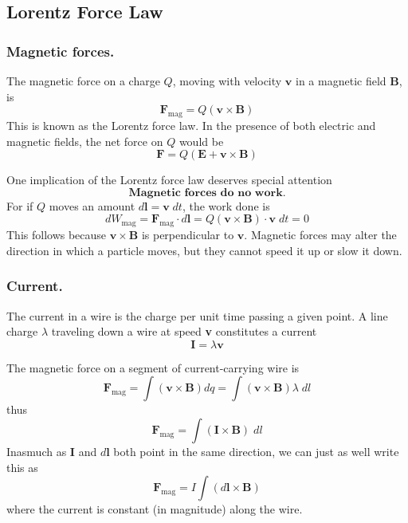 \documentclass[../../../main.tex]{subfiles}
\begin{document}
\subsection{Lorentz Force Law}
\subsubsection{Magnetic forces.} The magnetic force on a charge $Q$, moving with velocity $\mathbf{v}$ in a magnetic field \textbf{B}, is
\begin{equation*}
    \mathbf{F}_{\text{mag}} = Q(\mathbf{v} \times \mathbf{B})
\end{equation*}
This is known as the Lorentz force law. In the presence of both electric and magnetic fields, the net force on $Q$ would be
\begin{equation*}
    \mathbf{F}= Q(\mathbf{E}+\mathbf{v} \times \mathbf{B})
\end{equation*}

One implication of the Lorentz force law deserves special attention
\begin{equation*}
    \boxed{
        \textbf{Magnetic forces do no work.}
    }
\end{equation*}
For if $Q$ moves an amount $d\mathbf{l} = \mathbf{v} \;dt$, the work done is
\begin{equation*}
    dW_{\text{mag}} = \mathbf{F}_{\text{mag}} \cdot d\mathbf{l} = Q(\mathbf{v} \times \mathbf{B}) \cdot \mathbf{v} \;dt = 0
\end{equation*}
This follows because $\mathbf{v} \times \mathbf{B}$ is perpendicular to $\mathbf{v}$. Magnetic forces may alter the direction in which a particle moves, but they cannot speed it up or slow it down.

\subsubsection{Current.} The current in a wire is the charge per unit time passing a given point. A line charge $\lambda$ traveling down a wire at speed \textbf{v} constitutes a current
\begin{equation*}
    \mathbf{I}=\lambda\mathbf{v}
\end{equation*}

The magnetic force on a segment of current-carrying wire is
\begin{equation*}
    \mathbf{F}_{\text{mag}}=\int (\mathbf{v} \times \mathbf{B}) dq=\int (\mathbf{v} \times \mathbf{B}) \lambda\; dl
\end{equation*}
thus
\begin{equation*}
    \mathbf{F}_{\text{mag}}=\int (\mathbf{I}\times \mathbf{B})\;dl
\end{equation*}
Inasmuch as $\mathbf{I}$ and $d\mathbf{l}$ both point in the same direction, we can just as well write
this as
\begin{equation*}
    \mathbf{F}_{\text{mag}}=I\int (d\mathbf{l}\times \mathbf{B})
\end{equation*}
where the current is constant (in magnitude) along the wire.
\end{document}
